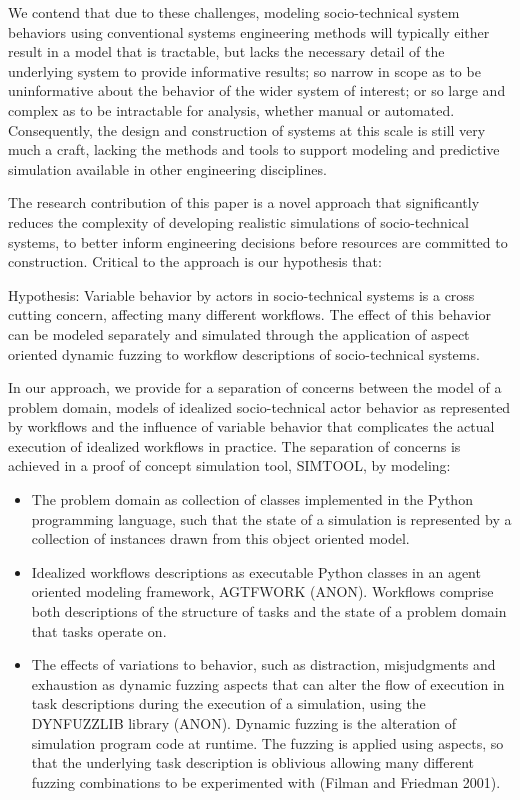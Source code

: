\documentclass{llncs}
\begin{document}
We contend that due to these challenges, modeling socio-technical system behaviors using conventional systems
engineering methods will typically either result in a model that is tractable, but lacks the necessary detail of the
underlying system to provide informative results; so narrow in scope as to be uninformative about the behavior of the
wider system of interest; or so large and complex as to be intractable for analysis, whether manual or automated.
Consequently, the design and construction of systems at this scale is still very much a craft, lacking the methods and
tools to support modeling and predictive simulation available in other engineering disciplines.

The research contribution of this paper is a novel approach that significantly reduces the complexity of developing
realistic simulations of socio-technical systems, to better inform engineering decisions before resources are committed
to construction. Critical to the approach is our hypothesis that:

Hypothesis: Variable behavior by actors in socio-technical systems is a cross cutting concern, affecting many different
workflows. The effect of this behavior can be modeled separately and simulated through the application of aspect
oriented dynamic fuzzing to workflow descriptions of socio-technical systems.

In our approach, we provide for a separation of concerns between the model of a problem domain, models of idealized
socio-technical actor behavior as represented by workflows and the influence of variable behavior that complicates the
actual execution of idealized workflows in practice.  The separation of concerns is achieved in a proof of concept
simulation tool, SIMTOOL, by modeling:

 \begin{itemize}
 \item The problem domain as collection of classes implemented in the Python programming language, such that the
   state of a simulation is represented by a collection of instances drawn from this object oriented model.
 \item Idealized workflows descriptions as executable Python classes in an agent oriented modeling framework, AGTFWORK
   (ANON).  Workflows comprise both descriptions of the structure of tasks and the state of a problem domain that tasks
   operate on.
 \item The effects of variations to behavior, such as distraction, misjudgments and exhaustion as dynamic fuzzing
   aspects that can alter the flow of execution in task descriptions during the execution of a simulation, using the
   DYNFUZZLIB library (ANON).  Dynamic fuzzing is the alteration of simulation program code at runtime.  The fuzzing
   is applied using aspects, so that the underlying task description is oblivious allowing many different fuzzing
   combinations to be experimented with (Filman and Friedman 2001).
 \end{itemize}
\end{document}
